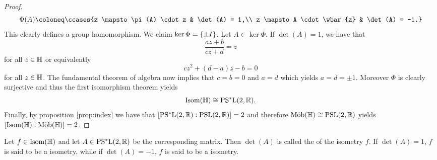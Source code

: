 \begin{proof}
\begin{equation*}
		\Phi(A) \coloneq \ccases{z \mapsto \pi(A) \cdot z & \det(A) = 1,\\
			z \mapsto A \cdot \wbar{z} & \det(A) = -1.}
	\end{equation*}
	This clearly defines a group homomorphism. We claim $\ker \Phi = \cbr[0]{\pm I}$. Let $A \in \ker \Phi$. If $\det(A) = 1$, we have that 
	\begin{equation*}
		\frac{az + b}{cz + d} = z
	\end{equation*}
	\noindent for all $z \in \mathbb{H}$ or equivalently
	\begin{equation*}
		cz^2 + (d - a)z - b = 0
	\end{equation*}
	\noindent for all $z \in \mathbb{H}$. The fundamental theorem of algebra now implies that $c = b = 0$ and $a = d$ which yields $a = d = \pm 1$. Moreover $\Phi$ is 
	clearly surjective and thus the first isomorphism theorem \cite[23]{grillet:abstract_algebra:2007} yields
	\begin{equation*}
		\mathrm{Isom}(\mathbb{H}) \cong \mathrm{PS^*L}(2,\mathbb{R}).
	\end{equation*}
	Finally, by proposition \ref{prop:index} we have that $\sbr[0]{\PSLrmstar(2,\Rbb) : \PSLrm(2,\Rbb)} = 2$ and therefore $\mathrm{M\ddot{o}b}(\mathbb{H}) \cong \mathrm{PSL}(2,\mathbb{R})$ yields $\sbr[0]{\Isom(\Hbb) : \Mob(\Hbb)} = 2$.
\end{proof}

\begin{definition}
	Let $f \in \mathrm{Isom}(\mathbb{H})$ and let $A \in \mathrm{PS^*L}(2,\mathbb{R})$ be the corresponding matrix. Then $\det(A)$ is called the  of the isometry $f$. If $\det(A) = 1$, $f$ is said to be a  isometry, while if $\det(A) = -1$, $f$ is said to be a  isometry.
\end{definition}

\printbibliography


